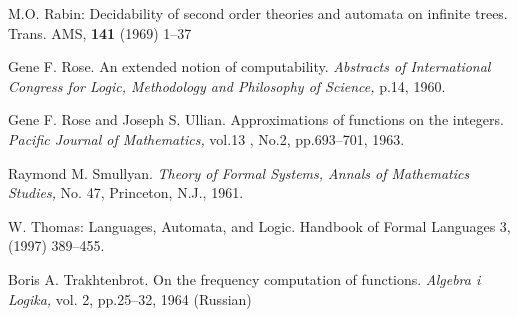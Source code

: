 \documentclass{llncs}
\begin{document}
\begin{thebibliography}{99}
M.O. Rabin: 
Decidability of second order theories and automata on infinite trees.
Trans. AMS, {\bf 141} (1969) 1--37
%

Gene F. Rose.
An extended notion of computability.
{\em Abstracts of International Congress for Logic, Methodology and Philosophy of Science,} p.14, 1960.

Gene F. Rose and Joseph S. Ullian.
Approximations of functions on the integers.
{\em Pacific Journal of Mathematics,} vol.13 , No.2, pp.693--701, 1963.

Raymond M. Smullyan.
{\em Theory of Formal Systems, Annals of Mathematics Studies,}
No. 47, Princeton, N.J., 1961.

W. Thomas: 
Languages, Automata, and Logic. 
Handbook of Formal Languages 3, (1997) 389--455.


Boris A. Trakhtenbrot.
On the frequency computation of functions.
{\em Algebra i Logika,} vol. 2, pp.25--32, 1964 (Russian)





\end{thebibliography}
\end{document}
